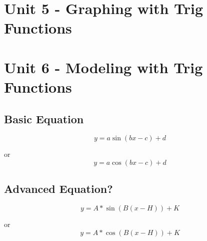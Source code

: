 \documentclass{article}
\begin{document}
\section*{Unit 5 - Graphing with Trig Functions}

\section*{Unit 6 - Modeling with Trig Functions}
\hfill \break
\subsection{Basic Equation}
\begin{displaymath}
    y=a\sin(bx-c)+d
\end{displaymath}

\hspace{3in} or
\begin{displaymath}
    y=a\cos(bx-c)+d
\end{displaymath}

\vspace{2mm}
\subsection{Advanced Equation?}
\begin{displaymath}
    y=A*\sin(B(x-H))+K
\end{displaymath}

\hspace{3in} or
\begin{displaymath}
    y=A*\cos(B(x-H))+K
\end{displaymath}

\vspace{4.9in}
\end{document}
